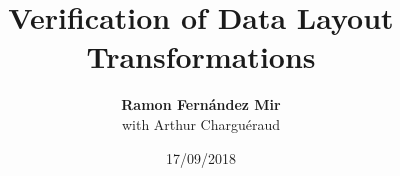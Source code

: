 \def\macrosUseBeamer{}



\usepackage{fancyvrb}
\usepackage{graphicx}
\usepackage{multicol}

\newcommand\tab{$\hphantom{--}$}





\title{Verification of Data Layout Transformations}
\author[Ramon Fern\'{a}ndez Mir]{{\bf Ramon Fern\'{a}ndez Mir}\\ \vspace{1em} with Arthur Charguéraud }
\date{17/09/2018}

\frame{\titlepage}





